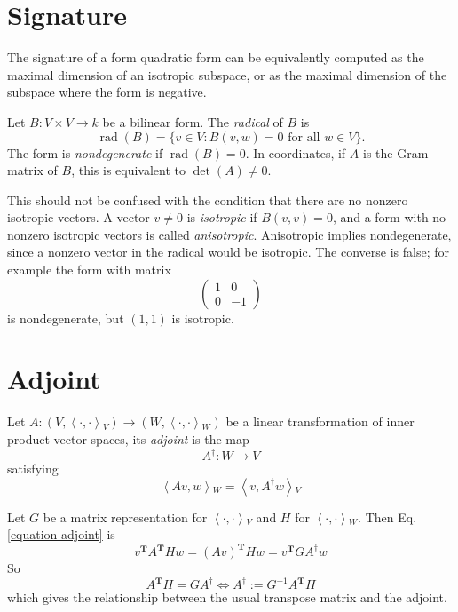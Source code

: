\section{Signature}
\label{section-signature}

The signature of a form quadratic form can be
equivalently computed as the
maximal dimension of an isotropic subspace,
or as the maximal dimension of the
subspace where the form is negative.

\begin{remark}
\label{remark-nondegenerate-vs-anisotropic}
Let $B:V \times V \to k$ be a bilinear form.
The {\it radical} of $B$ is
$$
\operatorname{rad}(B)=
\{v \in V : B(v,w)=0\text{ for all }w
\in V\}.
$$
The form is {\it nondegenerate} if
$\operatorname{rad}(B)=0$. In coordinates,
if $A$ is the Gram matrix of $B$, this is
equivalent to $\det(A)\neq 0$.

This should not be confused with the
condition that there are no nonzero isotropic
vectors. A vector $v\neq 0$ is {\it
isotropic} if $B(v,v)=0$, and a form with no
nonzero isotropic vectors is called
{\it anisotropic}. Anisotropic implies
nondegenerate, since a nonzero vector in the
radical would be isotropic. The converse is
false; for example the form with matrix
$$
\begin{pmatrix}
1&0\\
0&-1
\end{pmatrix}
$$
is nondegenerate, but $(1,1)$ is isotropic.
\end{remark}

\section{Adjoint}
\label{section-adjoint}

\begin{definition}
\label{definition-adjoint}
Let  $A:(V,\left\langle{}\cdot,\cdot\right\rangle{}_V) \to
(W,\left\langle{}\cdot,\cdot\right\rangle{}_W)$ be a
linear transformation of inner product vector
spaces, its {\it adjoint} is the
map
$$
A^{\dag}:W\to V
$$
satisfying
\begin{equation}
\label{equation-adjoint}
\left\langle{}Av,w\right\rangle{}_W=\left\langle{}v,A^\dag w\right\rangle{}_V
\end{equation}
\end{definition}

Let $G$ be a matrix representation for
$\left\langle{}\cdot,\cdot\right\rangle{}_V$ and $H$ for
$\left\langle{}\cdot,\cdot\right\rangle{}_W$. Then Eq.
\ref{equation-adjoint} is
$$
v^{\mathbf{T}}A^{\mathbf{T}}Hw=(Av)
^{\mathbf{T}}Hw=v^{\mathbf{T}}GA^\dag
w
$$
So
\begin{equation}
\label{equation-adjoint-transpose}
A^{\mathbf{T}}H=GA^\dag \iff
A^\dag:=G^{-1}A^{\mathbf{T}}H
\end{equation}
which gives the relationship between the
usual transpose matrix and the adjoint.

